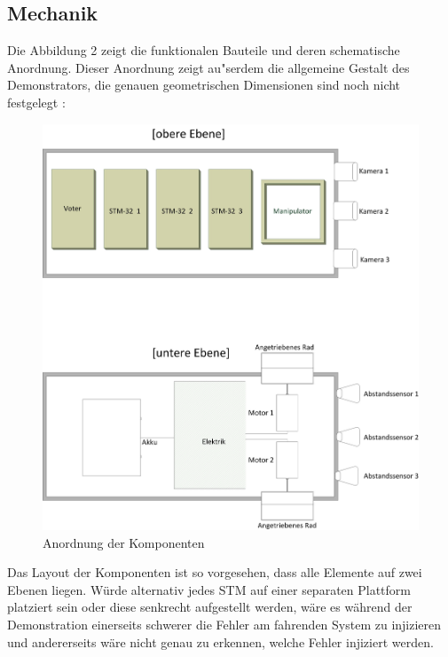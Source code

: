 \subsection{Mechanik}
\label{SystementwurfMechanik}
Die Abbildung 2 zeigt die funktionalen Bauteile und deren schematische Anordnung.
Dieser Anordnung zeigt au"serdem die allgemeine Gestalt des Demonstrators, die genauen geometrischen Dimensionen sind noch nicht festgelegt :
\begin{figure}[H]
\centering
\includegraphics[width=0.7\linewidth]{Bilder/FaTNet_mechanik}
\caption{Anordnung der Komponenten}
\end{figure}
Das Layout der Komponenten ist so vorgesehen, dass alle Elemente auf zwei Ebenen liegen. Würde alternativ jedes STM auf einer separaten Plattform platziert sein oder diese senkrecht aufgestellt werden, wäre es während der Demonstration einerseits schwerer die Fehler am fahrenden System zu injizieren und andererseits wäre nicht genau zu erkennen, welche Fehler injiziert werden.

